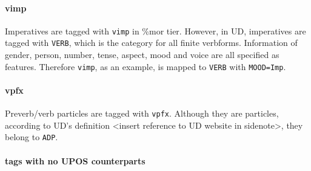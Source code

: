 \paragraph{vimp}
Imperatives are tagged with \texttt{vimp} in \%mor tier. However, in UD, imperatives are tagged with \texttt{VERB}, which is the category for all finite verbforms. Information of gender, person, number, tense, aspect, mood and voice are all specified as features. Therefore \texttt{vimp}, as an example, is mapped to \texttt{VERB} with \texttt{MOOD=Imp}.\\

\paragraph{vpfx}
Preverb/verb particles are tagged with \texttt{vpfx}. Although they are particles, according to UD's definition <insert reference to UD website in sidenote>, they belong to \texttt{ADP}.\\

\paragraph{tags with no UPOS counterparts}




